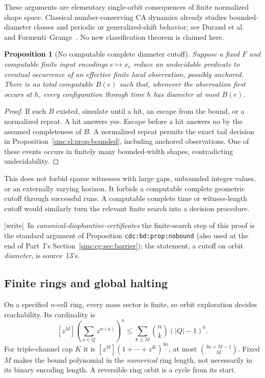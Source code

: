 \documentclass[11pt,letterpaper]{article}
\numberwithin{equation}{section}
\newtheorem{proposition}[theorem]{Proposition}
\theoremstyle{definition}
\theoremstyle{remark}
\newcommand{\wtag}{\textup{[write]}}
\begin{document}
These arguments are elementary single-orbit consequences of finite normalized shape space. Classical number-conserving CA dynamics already studies bounded-diameter classes and periodic or generalized-shift behavior; see Durand et al.~\cite{durand} and Formenti--Grange~\cite{formentigrange}. No new classification theorem is claimed here.

\begin{proposition}[No computable complete diameter cutoff]\label{smc:sl:prop:cutoff}
Suppose a fixed $F$ and computable finite input encodings $e\mapsto x_e$ reduce an undecidable predicate to eventual occurrence of an effective finite local observation, possibly anchored. There is no total computable $B(e)$ such that, whenever the observation first occurs at $h$, every configuration through time $h$ has diameter at most $B(e)$.
\end{proposition}
\begin{proof}
If such $B$ existed, simulate until a hit, an escape from the bound, or a normalized repeat. A hit answers yes. Escape before a hit answers no by the assumed completeness of $B$. A normalized repeat permits the exact tail decision in Proposition~\ref{smc:sl:prop:bounded}, including anchored observations. One of these events occurs in finitely many bounded-width shapes, contradicting undecidability.
\end{proof}
This does not forbid sparse witnesses with large gaps, unbounded integer values, or an externally varying horizon. It forbids a computable complete geometric cutoff through successful runs. A computable complete time or witness-length cutoff would similarly turn the relevant finite search into a decision procedure.

\wtag\ In \emph{canonical-diophantine-certificates} the finite-search step of this proof is the standard argument of Proposition \texttt{cdc:bd:prop:nobound} (also used at the end of Part~I's Section~\ref{smc:cg:sec:barrier}); the statement, a cutoff on orbit \emph{diameter}, is source~13's.

\subsection{Finite rings and global halting}
On a specified $n$-cell ring, every mass sector is finite, so orbit exploration decides reachability. Its cardinality is
\[
 [z^M]\left(\sum_{a\in Q}z^{w(a)}\right)^n
 \le \sum_{k\le M}\binom nk(|Q|-1)^k.
\]
For triple-channel cap $K$ it is $[z^M](1+\cdots+z^K)^{3n}$, at most $\binom{3n+M-1}{M}$. Fixed $M$ makes the bound polynomial in the \emph{numerical} ring length, not necessarily in its binary encoding length. A reversible ring orbit is a cycle from its start.
\end{document}
